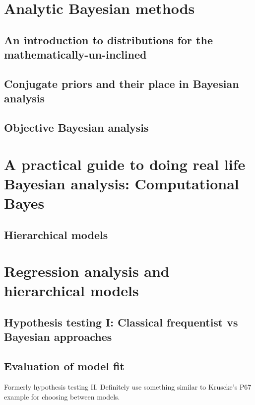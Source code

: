 \documentclass[11pt,fullpage]{book}
\begin{document}
\part{Analytic Bayesian methods}
\chapter{An introduction to distributions for the mathematically-un-inclined}\label{chap:distributions}

\chapter{Conjugate priors and their place in Bayesian analysis}\label{chap:conjugate}

\chapter{Objective Bayesian analysis}\label{chap:ObjectiveBayes}

\part{A practical guide to doing real life Bayesian analysis: Computational Bayes}\label{part:computationalBayes}

\chapter{Hierarchical models}\label{chap:hierarchicalModels}

\part{Regression analysis and hierarchical models}
\chapter{Hypothesis testing I: Classical frequentist vs Bayesian approaches}

\chapter{Evaluation of model fit}\label{chap:ModelFit}
Formerly hypothesis testing II. Definitely use something similar to Kruscke's P67 example for choosing between models.



\end{document}
